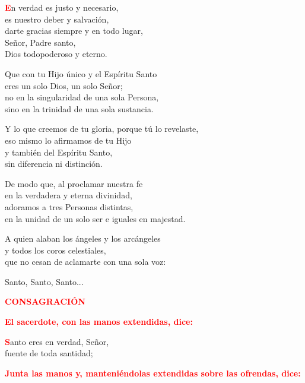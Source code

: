 \documentclass[12pt, letterpaper, spanish]{report}
\begin{document}
\Large \lettrine[lines=1]{\bfseries \textcolor{red}{E}}{}n verdad es justo y necesario,\\
es nuestro deber y salvaci\'on,\\
darte gracias siempre y en todo lugar,\\
Se\~nor, Padre santo,\\
Dios todopoderoso y eterno.\newline

Que con tu Hijo \'unico y el Esp\'iritu Santo\\
eres un solo Dios, un solo Se\~nor;\\
no en la singularidad de una sola Persona,\\
sino en la trinidad de una sola sustancia.\newline

Y lo que creemos de tu gloria, porque t\'u lo revelaste,\\
eso mismo lo afirmamos de tu Hijo\\
y tambi\'en del Esp\'iritu Santo,\\
sin diferencia ni distinci\'on.\newline

De modo que, al proclamar nuestra fe\\
en la verdadera y eterna divinidad,\\
adoramos a tres Personas distintas,\\
en la unidad de un solo ser e iguales en majestad.\newline

A quien alaban los \'angeles y los arc\'angeles\\
y todos los coros celestiales,\\
que no cesan de aclamarte con una sola voz:\newline

Santo, Santo, Santo...\newline

\Large {\bfseries \textcolor{red}{CONSAGRACI\'ON}} \newline

\large{\bfseries \textcolor{red}{El sacerdote, con las manos extendidas, dice:}}

\Large \lettrine[lines=1]{\bfseries \textcolor{red}{S}}{}anto eres en verdad, Se\~nor,\\
fuente de toda santidad;\newline

\large{\bfseries \textcolor{red}{Junta las manos y, manteni\'endolas extendidas sobre las ofrendas, dice:}}\newline
\end{document}
